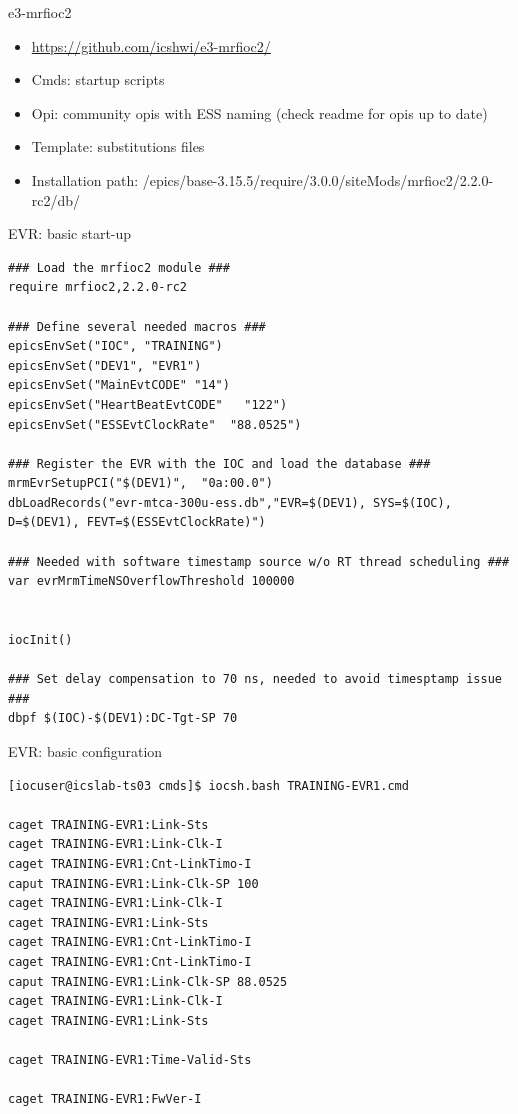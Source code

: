 \documentclass[
  9pt
  , table
  , ignorenonframetext
]{beamer}
\begin{document}
\begin{frame}{e3-mrfioc2}
  \begin{itemize}
    \item \url{https://github.com/icshwi/e3-mrfioc2/}
    \item Cmds: startup scripts
    \item Opi: community opis with ESS naming (check readme for opis up to date)
    \item Template: substitutions files
    \item Installation path: /epics/base-3.15.5/require/3.0.0/siteMods/mrfioc2/2.2.0-rc2/db/
  \end{itemize}
\end{frame}

\begin{frame}[fragile]{EVR: basic start-up}
\begin{lstlisting}[style=termstyle,breaklines=true,basicstyle=\scriptsize]
### Load the mrfioc2 module ###
require mrfioc2,2.2.0-rc2

### Define several needed macros ###
epicsEnvSet("IOC", "TRAINING")
epicsEnvSet("DEV1", "EVR1")
epicsEnvSet("MainEvtCODE" "14")
epicsEnvSet("HeartBeatEvtCODE"   "122")
epicsEnvSet("ESSEvtClockRate"  "88.0525")

### Register the EVR with the IOC and load the database ###
mrmEvrSetupPCI("$(DEV1)",  "0a:00.0")
dbLoadRecords("evr-mtca-300u-ess.db","EVR=$(DEV1), SYS=$(IOC), D=$(DEV1), FEVT=$(ESSEvtClockRate)")

### Needed with software timestamp source w/o RT thread scheduling ###
var evrMrmTimeNSOverflowThreshold 100000


iocInit()

### Set delay compensation to 70 ns, needed to avoid timesptamp issue ###
dbpf $(IOC)-$(DEV1):DC-Tgt-SP 70

\end{lstlisting}
\end{frame}

\begin{frame}[fragile]{EVR: basic configuration}
\begin{lstlisting}[style=termstyle,breaklines=true,basicstyle=\scriptsize]
[iocuser@icslab-ts03 cmds]$ iocsh.bash TRAINING-EVR1.cmd

caget TRAINING-EVR1:Link-Sts
caget TRAINING-EVR1:Link-Clk-I
caget TRAINING-EVR1:Cnt-LinkTimo-I
caput TRAINING-EVR1:Link-Clk-SP 100
caget TRAINING-EVR1:Link-Clk-I
caget TRAINING-EVR1:Link-Sts
caget TRAINING-EVR1:Cnt-LinkTimo-I
caget TRAINING-EVR1:Cnt-LinkTimo-I
caput TRAINING-EVR1:Link-Clk-SP 88.0525
caget TRAINING-EVR1:Link-Clk-I
caget TRAINING-EVR1:Link-Sts

caget TRAINING-EVR1:Time-Valid-Sts

caget TRAINING-EVR1:FwVer-I

\end{lstlisting}
\end{frame}
\end{document}
